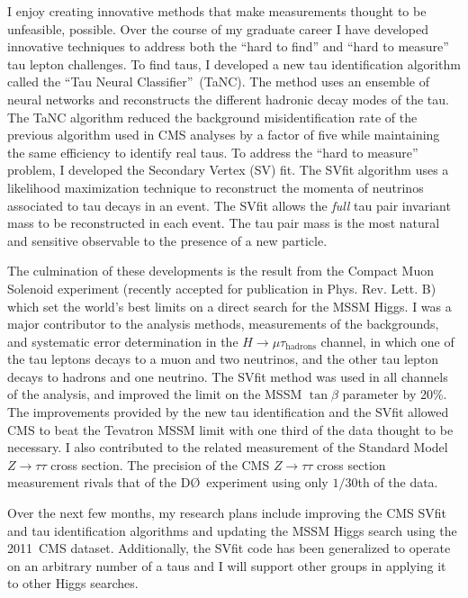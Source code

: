 \documentclass{scrartcl}        %
\begin{document}
\begin{cv}{}
I enjoy creating innovative methods that make measurements thought to be
unfeasible, possible.  Over the course of my graduate career I have developed
innovative techniques to address both the ``hard to find'' and ``hard to
measure'' tau lepton challenges.  To find taus, I developed a new tau
identification algorithm called the ``Tau Neural Classifier''~(TaNC).  The
method uses an ensemble of neural networks and reconstructs the different
hadronic decay modes of the tau.  The TaNC algorithm reduced the background
misidentification rate of the previous algorithm used in CMS analyses by a
factor of five while maintaining the same efficiency to identify real taus.  To
address the ``hard to measure'' problem, I developed the Secondary Vertex (SV)
fit.  The SVfit algorithm uses a likelihood maximization technique to
reconstruct the momenta of neutrinos associated to tau decays in an event.  The
SVfit allows the \emph{full} tau pair invariant mass to be reconstructed in each
event. The tau pair mass is the most natural and sensitive observable to
the presence of a new particle.

The culmination of these developments is the result from the Compact Muon
Solenoid experiment (recently accepted for publication in Phys.  Rev. Lett. B)
which set the world's best limits on a direct search for the MSSM Higgs.  I was
a major contributor to the analysis methods, measurements of the backgrounds,
and systematic error determination in the $H \to \mu \tau_{\mathrm{hadrons}}$
channel, in which one of the tau leptons decays to a muon and two neutrinos, and
the other tau lepton decays to hadrons and one neutrino.  The SVfit method was
used in all channels of the analysis, and improved the limit on the MSSM
$\tan\beta$ parameter by 20\%.  The improvements provided by the new tau
identification and the SVfit allowed CMS to beat the Tevatron MSSM limit with
one third of the data thought to be necessary.  I also contributed to the
related measurement of the Standard Model $Z\to\tau\tau$ cross section. The
precision of the CMS $Z\to\tau\tau$ cross section measurement rivals that of the
D\O~experiment using only $1/30$th of the data. 

Over the next few months, my research plans include improving the CMS SVfit and
tau identification algorithms and updating the MSSM Higgs search using the
2011~CMS dataset.  Additionally, the SVfit code has been generalized to
operate on an arbitrary number of a taus and I will support other groups in
applying it to other Higgs searches.  


\end{cv}
\end{document}
